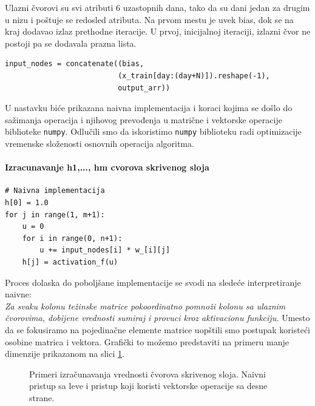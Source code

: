 \documentclass[a4paper]{article}
\begin{document}
Ulazni čvorovi su svi atributi 6 uzastopnih dana, tako da su dani jedan za drugim u nizu i poštuje se redosled atributa. Na prvom mestu je uvek bias, dok se na kraj dodavao izlaz prethodne iteracije. U prvoj, inicijalnoj iteraciji, izlazni čvor ne postoji pa se dodavala prazna lista.
\begin{verbatim}
input_nodes = concatenate((bias, 
                          (x_train[day:(day+N)]).reshape(-1), 
                          output_arr))
\end{verbatim}

U nastavku biće prikazana naivna implementacija i koraci kojima se došlo do sažimanja operacija i njihovog prevođenja u matrične i vektorske operacije biblioteke \texttt{numpy}. Odlučili smo da iskoristimo \texttt{numpy} biblioteku radi optimizacije vremenske složenosti osnovnih operacija algoritma.

\paragraph{Izracunavanje h1,..., hm cvorova skrivenog sloja}
\begin{verbatim}
# Naivna implementacija
h[0] = 1.0
for j in range(1, m+1):
    u = 0
    for i in range(0, n+1):
        u += input_nodes[i] * w_[i][j]
    h[j] = activation_f(u)
\end{verbatim}

Proces dolaska do poboljšane implementacije se svodi na sledeće interpretiranje naivne: \\
{\it Za svaku kolonu težinske matrice pokoordinatno pomnoži kolonu sa ulaznim čvorovima, dobijene vrednosti sumiraj i provuci kroz aktivacionu funkciju.} Umesto da se fokusiramo na pojedinačne elemente matrice uopštili smo postupak koristeći osobine matrica i vektora. Grafički to možemo predstaviti na primeru manje dimenzije prikazanom na slici \ref{fig:izracunavanjewp}.

\begin{figure}[h!]
    \caption{Primeri izračunavanja vrednosti čvorova skrivenog sloja. Naivni pristup sa leve i pristup koji koristi vektorske operacije sa desne strane.}
    \label{fig:izracunavanjewp}
\end{figure}
\end{document}
